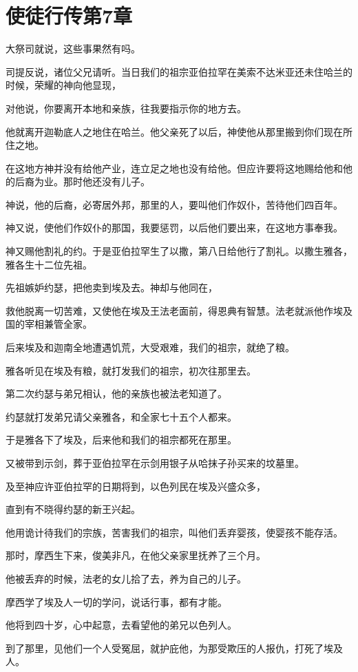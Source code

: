 \documentclass[12pt,oneside]{book}
\begin{document}
\chapter{使徒行传第7章}
大祭司就说，这些事果然有吗。

司提反说，诸位父兄请听。当日我们的祖宗亚伯拉罕在美索不达米亚还未住哈兰的时候，荣耀的神向他显现，

对他说，你要离开本地和亲族，往我要指示你的地方去。

他就离开迦勒底人之地住在哈兰。他父亲死了以后，神使他从那里搬到你们现在所住之地。

在这地方神并没有给他产业，连立足之地也没有给他。但应许要将这地赐给他和他的后裔为业。那时他还没有儿子。

神说，他的后裔，必寄居外邦，那里的人，要叫他们作奴仆，苦待他们四百年。

神又说，使他们作奴仆的那国，我要惩罚，以后他们要出来，在这地方事奉我。

神又赐他割礼的约。于是亚伯拉罕生了以撒，第八日给他行了割礼。以撒生雅各，雅各生十二位先祖。

先祖嫉妒约瑟，把他卖到埃及去。神却与他同在，

救他脱离一切苦难，又使他在埃及王法老面前，得恩典有智慧。法老就派他作埃及国的宰相兼管全家。

后来埃及和迦南全地遭遇饥荒，大受艰难，我们的祖宗，就绝了粮。

雅各听见在埃及有粮，就打发我们的祖宗，初次往那里去。

第二次约瑟与弟兄相认，他的亲族也被法老知道了。

约瑟就打发弟兄请父亲雅各，和全家七十五个人都来。

于是雅各下了埃及，后来他和我们的祖宗都死在那里。

又被带到示剑，葬于亚伯拉罕在示剑用银子从哈抹子孙买来的坟墓里。

及至神应许亚伯拉罕的日期将到，以色列民在埃及兴盛众多，

直到有不晓得约瑟的新王兴起。

他用诡计待我们的宗族，苦害我们的祖宗，叫他们丢弃婴孩，使婴孩不能存活。

那时，摩西生下来，俊美非凡，在他父亲家里抚养了三个月。

他被丢弃的时候，法老的女儿拾了去，养为自己的儿子。

摩西学了埃及人一切的学问，说话行事，都有才能。

他将到四十岁，心中起意，去看望他的弟兄以色列人。

到了那里，见他们一个人受冤屈，就护庇他，为那受欺压的人报仇，打死了埃及人。
\end{document}
